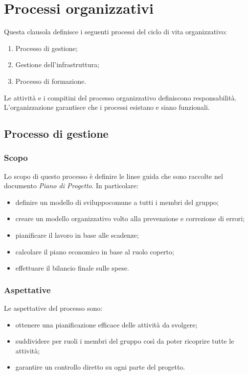 \section{Processi organizzativi}
	Questa clausola definisce i seguenti processi del ciclo di vita organizzativo:
	\begin{enumerate}
		\item Processo di gestione;
		\item Gestione dell'infrastruttura;
		\item Processo di formazione.
	\end{enumerate}
	Le attività e i compitini del processo organizzativo definiscono responsabilità. L'organizzazione garantisce che i processi esistano e siano funzionali.
	
	
	
	
	\subsection{Processo di gestione}
		\subsubsection{Scopo}

		Lo scopo di questo processo è definire le linee guida che sono raccolte nel documento \textit{Piano di Progetto}. In particolare:
		\begin{itemize}
			\item definire un modello di sviluppo\glosp comune a tutti i membri del gruppo; 
			\item creare un modello organizzativo volto alla prevenzione e correzione di errori;
			\item pianificare il lavoro in base alle scadenze;
			\item calcolare il piano economico in base al ruolo coperto;
			\item effettuare il bilancio finale sulle spese.
		\end{itemize}

		\subsubsection{Aspettative}
		Le aspettative del processo sono:
		\begin{itemize}
			\item ottenere una pianificazione efficace delle attività da svolgere;
			\item suddividere per ruoli i membri del gruppo così da poter ricoprire tutte le attività;
			\item garantire un controllo diretto su ogni parte del progetto.
		\end{itemize}

